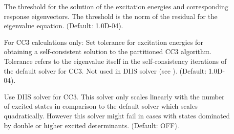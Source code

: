 \begin{description}
\item[] 

The threshold for the solution of the excitation energies and
corresponding response eigenvectors. 
The threshold is the norm of the residual for the eigenvalue equation.
(Default: 1.0D-04). 

%
%
%
%
%
%
%
\item[] 
For CC3 calculations only: 
Set tolerance for excitation energies for obtaining a self-consistent
solution to the partitioned CC3 algorithm.
Tolerance refers to the eigenvalue itself in the self-consistency iterations
of the default solver for CC3. Not used in DIIS solver (see ).
(Default: 1.0D-04).

\item[]
Use DIIS solver for CC3.
This solver only scales linearly with the number of excited states
in comparison to the default solver which scales quadratically.
However this solver might fail in cases with states dominated by
double or higher excited determinants. 
(Default: OFF).

%
%
\end{description}
